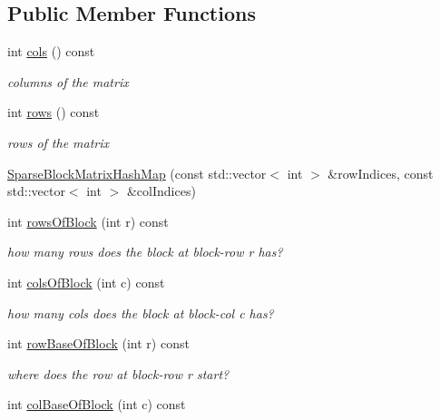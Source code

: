 \subsection*{Public Member Functions}
\begin{DoxyCompactItemize}
\item 
int \mbox{\hyperlink{classg2o_1_1_sparse_block_matrix_hash_map_a8bd11b2428897c5c086f0d903affcbec}{cols}} () const
\begin{DoxyCompactList}\small\item\em columns of the matrix \end{DoxyCompactList}\item 
int \mbox{\hyperlink{classg2o_1_1_sparse_block_matrix_hash_map_ae2749be9e20ee0f2ca85df29b74ecb25}{rows}} () const
\begin{DoxyCompactList}\small\item\em rows of the matrix \end{DoxyCompactList}\item 
\mbox{\hyperlink{classg2o_1_1_sparse_block_matrix_hash_map_abe4b64edb59d95b632d7f655445157df}{Sparse\+Block\+Matrix\+Hash\+Map}} (const std\+::vector$<$ int $>$ \&row\+Indices, const std\+::vector$<$ int $>$ \&col\+Indices)
\item 
int \mbox{\hyperlink{classg2o_1_1_sparse_block_matrix_hash_map_afd5e53b51549fbe1c71d96f986120b65}{rows\+Of\+Block}} (int r) const
\begin{DoxyCompactList}\small\item\em how many rows does the block at block-\/row r has? \end{DoxyCompactList}\item 
int \mbox{\hyperlink{classg2o_1_1_sparse_block_matrix_hash_map_a7f9538beeea7bed6300e864dbefccff5}{cols\+Of\+Block}} (int c) const
\begin{DoxyCompactList}\small\item\em how many cols does the block at block-\/col c has? \end{DoxyCompactList}\item 
int \mbox{\hyperlink{classg2o_1_1_sparse_block_matrix_hash_map_a9a22f09766c630673066c4ae71be7772}{row\+Base\+Of\+Block}} (int r) const
\begin{DoxyCompactList}\small\item\em where does the row at block-\/row r start? \end{DoxyCompactList}\item 
int \mbox{\hyperlink{classg2o_1_1_sparse_block_matrix_hash_map_acb3612df298b2c482db36f6c40fc44c0}{col\+Base\+Of\+Block}} (int c) const

\end{DoxyCompactItemize}
